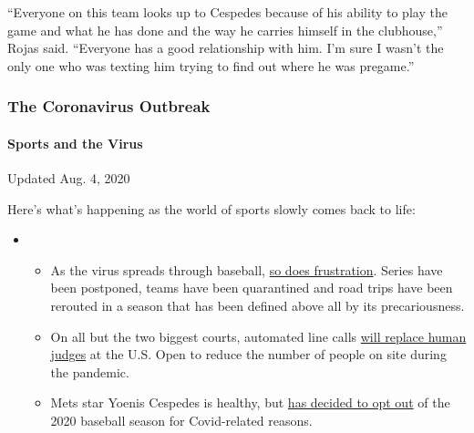 ``Everyone on this team looks up to Cespedes because of his ability to
play the game and what he has done and the way he carries himself in the
clubhouse,'' Rojas said. ``Everyone has a good relationship with him.
I'm sure I wasn't the only one who was texting him trying to find out
where he was pregame.''

\hypertarget{the-coronavirus-outbreak}{%
\subsubsection{The Coronavirus
Outbreak}\label{the-coronavirus-outbreak}}

\hypertarget{sports-and-the-virus}{%
\paragraph{Sports and the Virus}\label{sports-and-the-virus}}

Updated Aug. 4, 2020

Here's what's happening as the world of sports slowly comes back to
life:

\begin{itemize}
\item
  \begin{itemize}
  \tightlist
  \item
    As the virus spreads through baseball,
    \href{https://www.nytimes3xbfgragh.onion/2020/08/03/sports/baseball/mlb-coronavirus-outbreak.html?action=click\&pgtype=Article\&state=default\&region=MAIN_CONTENT_2\&context=storylines_keepup}{so
    does frustration}. Series have been postponed, teams have been
    quarantined and road trips have been rerouted in a season that has
    been defined above all by its precariousness.
  \item
    On all but the two biggest courts, automated line calls
    \href{https://www.nytimes3xbfgragh.onion/2020/08/03/sports/tennis/us-open-hawkeye-line-judges.html?action=click\&pgtype=Article\&state=default\&region=MAIN_CONTENT_2\&context=storylines_keepup}{will
    replace human judges} at the U.S. Open to reduce the number of
    people on site during the pandemic.
  \item
    Mets star Yoenis Cespedes is healthy, but
    \href{https://www.nytimes3xbfgragh.onion/2020/08/02/sports/baseball/Yoenis-cespedes-opt-out-rule.html?action=click\&pgtype=Article\&state=default\&region=MAIN_CONTENT_2\&context=storylines_keepup}{has
    decided to opt out} of the 2020 baseball season for Covid-related
    reasons.
  \end{itemize}
\end{itemize}

